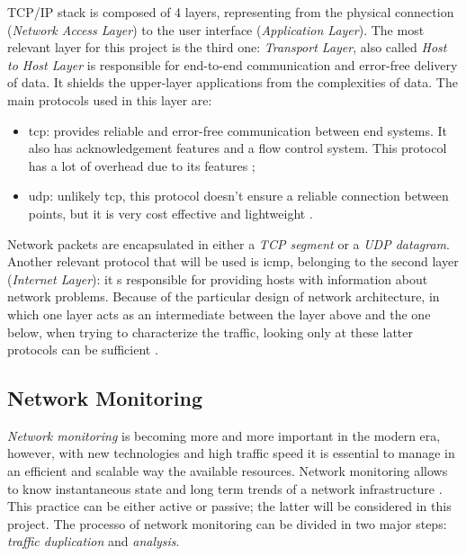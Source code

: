 \noindent TCP/IP stack is composed of 4 layers, representing from the physical connection (\textit{Network Access Layer}) to the user interface (\textit{Application Layer}). The most relevant layer for this project is the third one: \textit{Transport Layer}, also called \textit{Host to Host Layer} is responsible for end-to-end communication and error-free delivery of data. It shields the upper-layer applications from the complexities of data. The main protocols used in this layer are:

\begin{itemize}
    \item[\faCaretRight] \gls{tcp}: provides reliable and error-free communication between end systems. It also has acknowledgement features and a flow control system. This protocol has a lot of overhead due to its features \cite{Kurose2012};
    \item[\faCaretRight] \gls{udp}: unlikely \gls{tcp}, this protocol doesn't ensure a reliable connection between points, but it is very cost effective and lightweight \cite{Kurose2012}.
\end{itemize}
Network packets are encapsulated in either a \textit{TCP segment} or a \textit{UDP datagram}. Another relevant protocol that will be used is \gls{icmp}, belonging to the second layer (\textit{Internet Layer}): it s responsible for providing hosts with information about network problems. Because of the particular design of network architecture, in which one layer acts as an intermediate between the layer above and the one below, when trying to characterize the traffic, looking only at these latter protocols can be sufficient \cite{Iglesias2015}.


\subsection{Network Monitoring}
\label{subsec:network-monitoring}

\textit{Network monitoring} is becoming more and more important in the modern era, however, with new technologies and high traffic speed it is essential to manage in an efficient and scalable way the available resources. Network monitoring allows to know instantaneous state and long term trends of a network infrastructure \cite{Svoboda2015}. This practice can be either active or passive; the latter will be considered in this project. The processo of network monitoring can be divided in two major steps: \textit{traffic duplication} and \textit{analysis}.


